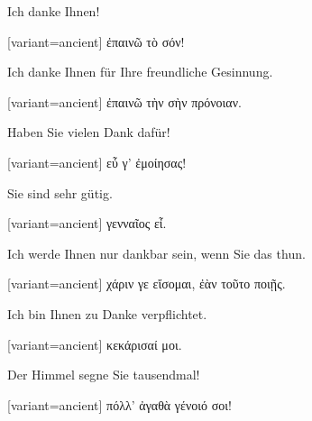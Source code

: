 Ich danke Ihnen!

\switchcolumn

\begin{greek}[variant=ancient]%
ἐπαινῶ τὸ σόν!

\end{greek}%
\switchcolumn*

Ich danke Ihnen für Ihre freundliche Gesinnung.

\switchcolumn

\begin{greek}[variant=ancient]%
ἐπαινῶ τὴν σὴν πρόνοιαν.

\end{greek}%
\switchcolumn*

Haben Sie vielen Dank dafür!

\switchcolumn

\begin{greek}[variant=ancient]%
εὖ γ' ἐμοίησας!

\end{greek}%
\switchcolumn*

Sie sind sehr gütig.

\switchcolumn

\begin{greek}[variant=ancient]%
γενναῖος εἶ.

\end{greek}%
\switchcolumn*

Ich werde Ihnen nur dankbar sein, wenn Sie das thun.

\switchcolumn

\begin{greek}[variant=ancient]%
χάριν γε εἴσομαι, ἐὰν τοῦτο ποιῇς.

\end{greek}%
\switchcolumn*

Ich bin Ihnen zu Danke verpflichtet.

\switchcolumn

\begin{greek}[variant=ancient]%
κεκάρισαί μοι.

\end{greek}%
\switchcolumn*

Der Himmel segne Sie tausendmal!

\switchcolumn

\begin{greek}[variant=ancient]%
πόλλ' ἀγαθὰ γένοιό σοι!

\end{greek}%
\switchcolumn*

